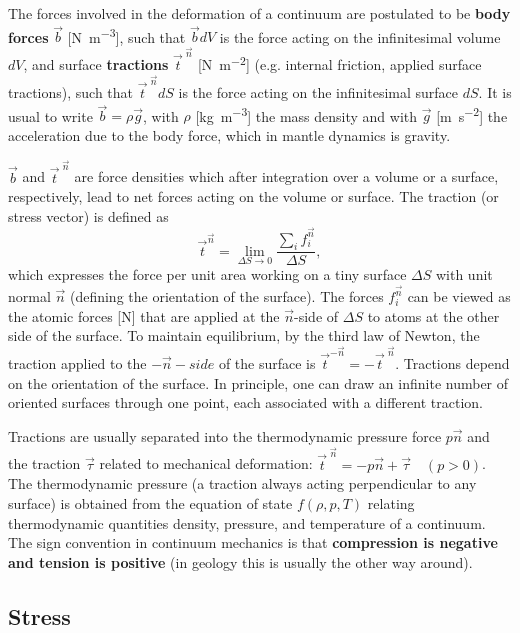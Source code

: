 The forces involved in the deformation of a continuum are postulated to be 
{\bf body forces}
$\vec{b}$ [\si{\newton\per\cubic\meter}], 
such that $\vec{b}dV$ is the force acting on the infinitesimal 
volume $dV$, and surface 
{\bf tractions} $\vec{t}^{\;\vec n}$ [\si{\newton\per\square\meter}]
(e.g. internal friction, applied surface tractions), 
such that $\vec{t}^{\;\vec n} dS$ is the
force acting on the infinitesimal surface $dS$. 
It is usual to write $\vec{b} = \rho \vec{g}$, 
with $\rho$ [\si{\kg\per\cubic\meter}] the
mass density and with $\vec{g}$ [\si{\meter\per\square\second}]
the acceleration due to the body force, which in
mantle dynamics is gravity. 

$\vec{b}$ and $\vec{t}^{\;\vec n}$
are force densities which after integration over a
volume or a surface, respectively, lead to net forces acting on 
the volume or surface.
The traction (or stress vector) is defined as
\[
\vec{t}^{\vec n} = \lim_{\Delta S \rightarrow 0} 
\frac{\sum\limits_i f_i^{\vec n}}{\Delta S},
\]
which expresses the force
per unit area working on a tiny surface $\Delta S$ 
with unit normal $\vec{n}$ (defining the orientation of
the surface). 
The forces $f_i^{\vec n}$  can be viewed as the atomic 
forces [\si{\newton}] that are applied at the
$\vec{n}$-side of $\Delta S$ to atoms at the other side of the surface. 
To maintain equilibrium, by the
third law of Newton, the traction applied to the $-\vec{n}-side$ of the surface 
is $\vec{t}^{-{\vec n}} = -\vec{t}^{\;\vec n}$.
Tractions depend on the orientation of the surface. In principle, one can draw an
infinite number of oriented surfaces through one point, each associated with a different
traction.



Tractions are usually separated into the thermodynamic pressure force $p \vec{n}$ and the traction $\vec{\tau}$
related to mechanical deformation: $\vec{t}^{\;\vec n} = -p \vec{n} + \vec{\tau} \quad (p>0)$. The thermodynamic pressure
(a traction always acting perpendicular to any surface) is obtained from the equation of
state $f(\rho,p,T)$ relating thermodynamic quantities density, pressure, and temperature of a
continuum. The sign convention in continuum mechanics is that {\bf compression is negative
and tension is positive} (in geology this is usually the other way around).

\subsection{Stress} 

